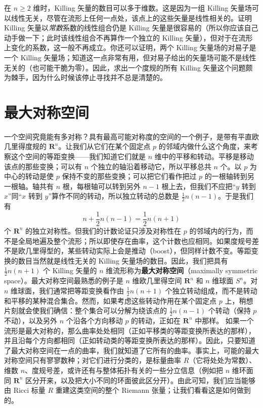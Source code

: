 在 $n\geq 2$ 维时，Killing 矢量的数目可以多于维数。这是因为一组 Killing 矢量场可以线性无关，尽管在流形上任何一点处，该点上的这些矢量是线性相关的。证明 Killing 矢量以\emph{常数}系数的线性组合仍是 Killing 矢量是很容易的（所以你应该自己动手做一下；此时该线性组合不再算作一个独立的 Killing 矢量），但对于在流形上变化的系数，这一般不再成立。你还可以证明，两个 Killing 矢量场的对易子是一个 Killing 矢量场；知道这一点非常有用，但对易子给出的矢量场可能不是线性无关的（也可能干脆为零）。因此，求出一个度规的所有 Killing 矢量这个问题颇为棘手，因为什么时候该停止寻找并不总是清楚的。

\section{最大对称空间}

一个空间究竟能有多对称？具有最高可能对称度的空间的一个例子，是带有平直欧几里得度规的 $\mathbf{R}^n$。让我们从它们在某个固定点 $p$ 的邻域内做什么这个角度，来考察这个空间的等距变换——我们知道它们就是 $n$ 维中的平移和转动。平移是移动该点的那些变换；可以有 $n$ 个独立的轴沿着移动它，所以平移总共 $n$ 个。以 $p$ 为中心的转动是使 $p$ 保持不变的那些变换；可以把它们看作把过 $p$ 的一根轴转到另一根轴。轴共有 $n$ 根，每根轴可以转到另外 $n-1$ 根上去，但我们不应把“$y$ 转到 $x$”同“$x$ 转到 $y$”算作不同的转动，所以独立转动的总数是 $\frac{1}{2}n(n-1)$。于是我们有
\begin{equation*}
n + \frac{1}{2}n(n-1) = \frac{1}{2}n(n+1)
\tag{3.189}
\end{equation*}
个 $\mathbf{R}^n$ 的独立对称性。但我们的计数论证只涉及对称性在 $p$ 的邻域内的行为，而不是全局地遍及整个流形；所以即使存在曲率，这个计数也应相同。如果度规号差不是欧几里得型的，某些转动实际上会是推动（boost），但同样计数不变。等距变换的数目当然就是线性无关的 Killing 矢量场的数目。因此，我们把具有 $\frac{1}{2}n(n+1)$ 个 Killing 矢量的 $n$ 维流形称为\textbf{最大对称空间}（maximally symmetric space）。最大对称空间最熟悉的例子是 $n$ 维欧几里得空间 $\mathbf{R}^n$ 和 $n$ 维球面 $S^n$。对 $n$ 维球面，我们通常把等距变换看作由 $\frac{1}{2}n(n+1)$ 个独立转动组成，而不是转动和平移的某种混合集合。然而，如果考虑这些转动作用在某个固定点 $p$ 上，稍想片刻就会使我们确信：整个集合可以分解为绕该点的 $\frac{1}{2}n(n-1)$ 个转动（保持 $p$ 不动），以及另外 $n$ 个沿各个方向移动 $p$ 的转动，正如在 $\mathbf{R}^n$ 中那样。
如果一个流形是最大对称的，那么曲率处处相同（正如平移类的等距变换所表达的那样），并且沿每个方向都相同（正如转动类的等距变换所表达的那样）。因此，只要知道了最大对称空间在一点的曲率，我们就知道了它所有的曲率。事实上，可能的最大对称空间只有寥寥数种；对它们进行分类的，是标量曲率 $R$（它将处处为常数）、维数 $n$、度规号差，或许还有与整体拓扑有关的一些分立信息（例如把 $n$ 维环面同 $\mathbf{R}^n$ 区分开来，以及把大小不同的环面彼此区分开）。由此可知，我们应当能够由 Ricci 标量 $R$ 重建这类空间的整个 Riemann 张量；让我们看看这是如何做到的。

